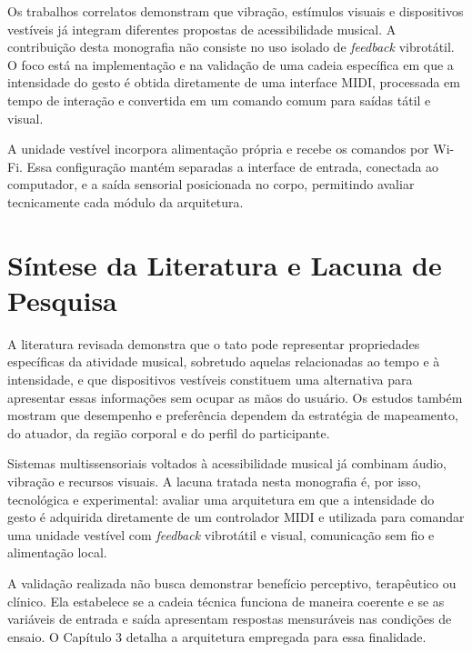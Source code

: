 Os trabalhos correlatos demonstram que vibração, estímulos visuais e dispositivos vestíveis já integram diferentes propostas de acessibilidade musical. A contribuição desta monografia não consiste no uso isolado de \textit{feedback} vibrotátil. O foco está na implementação e na validação de uma cadeia específica em que a intensidade do gesto é obtida diretamente de uma interface MIDI, processada em tempo de interação e convertida em um comando comum para saídas tátil e visual.

A unidade vestível incorpora alimentação própria e recebe os comandos por Wi-Fi. Essa configuração mantém separadas a interface de entrada, conectada ao computador, e a saída sensorial posicionada no corpo, permitindo avaliar tecnicamente cada módulo da arquitetura.

\section{Síntese da Literatura e Lacuna de Pesquisa}

A literatura revisada demonstra que o tato pode representar propriedades específicas da atividade musical, sobretudo aquelas relacionadas ao tempo e à intensidade, e que dispositivos vestíveis constituem uma alternativa para apresentar essas informações sem ocupar as mãos do usuário. Os estudos também mostram que desempenho e preferência dependem da estratégia de mapeamento, do atuador, da região corporal e do perfil do participante.

Sistemas multissensoriais voltados à acessibilidade musical já combinam áudio, vibração e recursos visuais. A lacuna tratada nesta monografia é, por isso, tecnológica e experimental: avaliar uma arquitetura em que a intensidade do gesto é adquirida diretamente de um controlador MIDI e utilizada para comandar uma unidade vestível com \textit{feedback} vibrotátil e visual, comunicação sem fio e alimentação local.

A validação realizada não busca demonstrar benefício perceptivo, terapêutico ou clínico. Ela estabelece se a cadeia técnica funciona de maneira coerente e se as variáveis de entrada e saída apresentam respostas mensuráveis nas condições de ensaio. O Capítulo 3 detalha a arquitetura empregada para essa finalidade.
